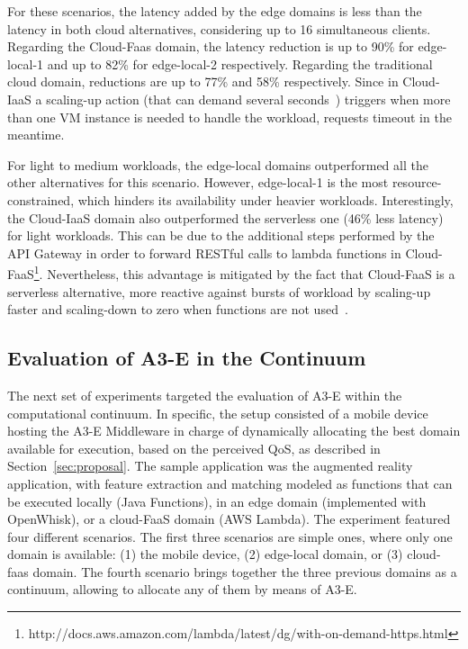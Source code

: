  For these scenarios, the latency added by the edge domains is less than the latency in both cloud alternatives, considering up to 16 simultaneous clients. Regarding the Cloud-Faas domain, the latency reduction is up to 90\% for edge-local-1 and up to 82\% for edge-local-2 respectively. Regarding the traditional cloud domain, reductions are up to 77\% and 58\% respectively. Since in Cloud-IaaS a scaling-up action (that can demand several seconds~\cite{Quatrocchi2016discrete}) triggers when more than one VM instance is needed to handle the workload, requests timeout in the meantime. 
 
 For light to medium workloads, the edge-local domains outperformed all the other alternatives for this scenario. However, edge-local-1 is the most resource-constrained, which hinders its availability under heavier workloads. Interestingly, the Cloud-IaaS domain also outperformed the serverless one (46\% less latency) for light workloads. This can be due to the additional steps performed by the API Gateway in order to forward RESTful calls to lambda functions in Cloud-FaaS\footnote{http://docs.aws.amazon.com/lambda/latest/dg/with-on-demand-https.html}. Nevertheless, this advantage is mitigated by the fact that Cloud-FaaS is a serverless alternative, more reactive against bursts of workload by scaling-up faster and scaling-down to zero when functions are not used~\cite{Villamizar2017lambda,Hendrickson:2016}.



\subsection{Evaluation of A3-E in the Continuum} 

The next set of experiments targeted the evaluation of A3-E within the computational continuum. In specific, the setup consisted of a mobile device hosting the A3-E Middleware in charge of dynamically allocating the best domain available for execution, based on the perceived QoS, as described in Section~\ref{sec:proposal}. The sample application was the  augmented reality application, with feature extraction and matching modeled as functions that can be executed locally (Java Functions), in an edge domain (implemented with OpenWhisk), or a cloud-FaaS domain (AWS Lambda). The experiment featured four different scenarios. The first three scenarios are simple ones, where only one domain is available: (1) the mobile device, (2) edge-local domain, or (3) cloud-faas domain. The fourth scenario brings together the three previous domains as a continuum, allowing to allocate any of them by means of A3-E. 

